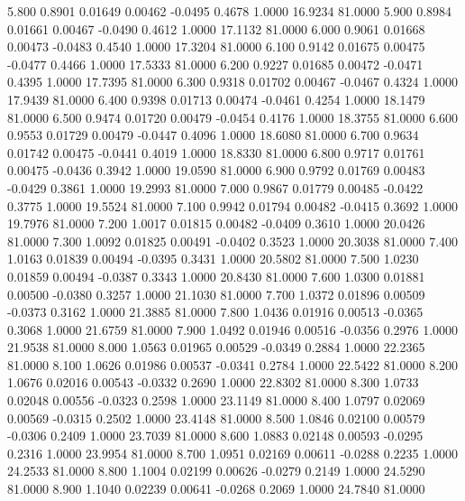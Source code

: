    5.800   0.8901   0.01649   0.00462  -0.0495   0.4678   1.0000  16.9234  81.0000
   5.900   0.8984   0.01661   0.00467  -0.0490   0.4612   1.0000  17.1132  81.0000
   6.000   0.9061   0.01668   0.00473  -0.0483   0.4540   1.0000  17.3204  81.0000
   6.100   0.9142   0.01675   0.00475  -0.0477   0.4466   1.0000  17.5333  81.0000
   6.200   0.9227   0.01685   0.00472  -0.0471   0.4395   1.0000  17.7395  81.0000
   6.300   0.9318   0.01702   0.00467  -0.0467   0.4324   1.0000  17.9439  81.0000
   6.400   0.9398   0.01713   0.00474  -0.0461   0.4254   1.0000  18.1479  81.0000
   6.500   0.9474   0.01720   0.00479  -0.0454   0.4176   1.0000  18.3755  81.0000
   6.600   0.9553   0.01729   0.00479  -0.0447   0.4096   1.0000  18.6080  81.0000
   6.700   0.9634   0.01742   0.00475  -0.0441   0.4019   1.0000  18.8330  81.0000
   6.800   0.9717   0.01761   0.00475  -0.0436   0.3942   1.0000  19.0590  81.0000
   6.900   0.9792   0.01769   0.00483  -0.0429   0.3861   1.0000  19.2993  81.0000
   7.000   0.9867   0.01779   0.00485  -0.0422   0.3775   1.0000  19.5524  81.0000
   7.100   0.9942   0.01794   0.00482  -0.0415   0.3692   1.0000  19.7976  81.0000
   7.200   1.0017   0.01815   0.00482  -0.0409   0.3610   1.0000  20.0426  81.0000
   7.300   1.0092   0.01825   0.00491  -0.0402   0.3523   1.0000  20.3038  81.0000
   7.400   1.0163   0.01839   0.00494  -0.0395   0.3431   1.0000  20.5802  81.0000
   7.500   1.0230   0.01859   0.00494  -0.0387   0.3343   1.0000  20.8430  81.0000
   7.600   1.0300   0.01881   0.00500  -0.0380   0.3257   1.0000  21.1030  81.0000
   7.700   1.0372   0.01896   0.00509  -0.0373   0.3162   1.0000  21.3885  81.0000
   7.800   1.0436   0.01916   0.00513  -0.0365   0.3068   1.0000  21.6759  81.0000
   7.900   1.0492   0.01946   0.00516  -0.0356   0.2976   1.0000  21.9538  81.0000
   8.000   1.0563   0.01965   0.00529  -0.0349   0.2884   1.0000  22.2365  81.0000
   8.100   1.0626   0.01986   0.00537  -0.0341   0.2784   1.0000  22.5422  81.0000
   8.200   1.0676   0.02016   0.00543  -0.0332   0.2690   1.0000  22.8302  81.0000
   8.300   1.0733   0.02048   0.00556  -0.0323   0.2598   1.0000  23.1149  81.0000
   8.400   1.0797   0.02069   0.00569  -0.0315   0.2502   1.0000  23.4148  81.0000
   8.500   1.0846   0.02100   0.00579  -0.0306   0.2409   1.0000  23.7039  81.0000
   8.600   1.0883   0.02148   0.00593  -0.0295   0.2316   1.0000  23.9954  81.0000
   8.700   1.0951   0.02169   0.00611  -0.0288   0.2235   1.0000  24.2533  81.0000
   8.800   1.1004   0.02199   0.00626  -0.0279   0.2149   1.0000  24.5290  81.0000
   8.900   1.1040   0.02239   0.00641  -0.0268   0.2069   1.0000  24.7840  81.0000
